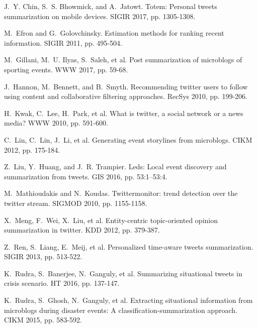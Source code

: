 \documentclass[runningheads]{llncs}
\begin{document}
\begin{thebibliography}{8}

J.~Y. Chin, S.~S. Bhowmick, and A.~Jatowt.
\newblock Totem: Personal tweets summarization on mobile devices.
\newblock SIGIR 2017, pp. 1305-1308.

M.~Efron and G.~Golovchinsky.
\newblock Estimation methods for ranking recent information.
\newblock SIGIR 2011, pp. 495-504.

M.~Gillani, M.~U. Ilyas, S.~Saleh, et al.
\newblock Post summarization of microblogs of sporting events.
\newblock WWW 2017, pp. 59-68.

J.~Hannon, M.~Bennett, and B.~Smyth.
\newblock Recommending twitter users to follow using content and collaborative filtering approaches.
\newblock RecSys 2010, pp. 199-206.

H.~Kwak, C.~Lee, H.~Park, et al.
\newblock What is twitter, a social network or a news media?
\newblock WWW 2010, pp. 591-600.

C.~Lin, C.~Lin, J.~Li, et al.
\newblock Generating event storylines from microblogs.
\newblock CIKM 2012, pp. 175-184.

Z.~Liu, Y.~Huang, and J.~R. Trampier.
\newblock Leds: Local event discovery and summarization from tweets.
\newblock GIS 2016, pp. 53:1--53:4.

M.~Mathioudakis and N.~Koudas.
\newblock Twittermonitor: trend detection over the twitter stream.
\newblock SIGMOD 2010, pp. 1155-1158.

X.~Meng, F.~Wei, X.~Liu, et al.
\newblock Entity-centric topic-oriented opinion summarization in twitter.
\newblock KDD 2012, pp. 379-387.

Z.~Ren, S.~Liang, E.~Meij, et al.
\newblock Personalized time-aware tweets summarization.
\newblock SIGIR 2013, pp. 513-522.

K.~Rudra, S.~Banerjee, N.~Ganguly, et al.
\newblock Summarizing situational tweets in crisis scenario.
\newblock HT 2016, pp. 137-147.

K.~Rudra, S.~Ghosh, N.~Ganguly, et al.
\newblock Extracting situational information from microblogs during disaster events: A classification-summarization approach.
\newblock CIKM 2015, pp. 583-592.


\end{thebibliography}
\end{document}
